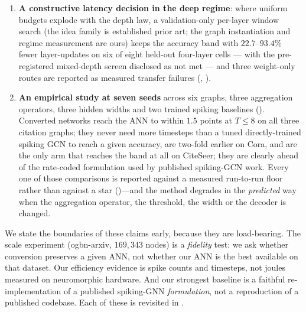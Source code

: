 \begin{enumerate}
accounting convention --- under a static synaptic-update proxy the conversion is the cheapest arm at
matched accuracy on all three graphs, while under event-driven counting a linear-readout external
arm is cheaper at low latency on two of them --- and the published-architecture formulation stays
more accurate on two graphs ().
\item \textbf{A constructive latency decision in the deep regime}: where uniform budgets explode
with the depth law, a validation-only per-layer window search (the idea family is established prior
art; the graph instantiation and regime measurement are ours) keeps the accuracy band with
$22.7$--$93.4\%$ fewer layer-updates on six of eight held-out four-layer cells --- with the
pre-registered mixed-depth screen disclosed as not met --- and three weight-only routes are
reported as measured transfer failures (, ).
\item \textbf{An empirical study at seven seeds} across six graphs, three aggregation operators, three
hidden widths and two trained spiking baselines (). Converted networks reach the ANN
to within $1.5$ points at $T \le 8$ on all three citation graphs; they never need more timesteps than
a tuned directly-trained spiking GCN to reach a given accuracy, are two-fold earlier on Cora, and are
the only arm that reaches the band at all on CiteSeer; they are clearly ahead of the rate-coded
formulation used by published spiking-GCN work. Every one of those comparisons is reported against a
measured run-to-run floor rather than against a star ()---and the method
degrades in the \emph{predicted} way when the aggregation
operator, the threshold, the width or the decoder is changed.
\end{enumerate}

We state the boundaries of these claims early, because they are load-bearing. The scale experiment
(ogbn-arxiv, $169{,}343$ nodes) is a \emph{fidelity} test: we ask whether conversion preserves a
given ANN, not whether our ANN is the best available on that dataset. Our efficiency evidence is
spike counts and timesteps, not joules measured on neuromorphic hardware. And our strongest baseline
is a faithful re-implementation of a published spiking-GNN \emph{formulation}, not a reproduction of
a published codebase. Each of these is revisited in .

